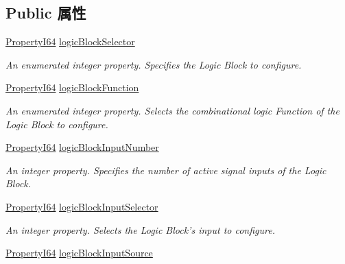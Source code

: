 \subsection*{Public 属性}
\begin{DoxyCompactItemize}
\item 
\hyperlink{group___common_interface_ga81749b2696755513663492664a18a893}{Property\+I64} \hyperlink{classmv_i_m_p_a_c_t_1_1acquire_1_1_gen_i_cam_1_1_logic_block_control_a9868d7f6639f3e51774871a571e0dfe7}{logic\+Block\+Selector}
\begin{DoxyCompactList}\small\item\em An enumerated integer property. Specifies the Logic Block to configure. \end{DoxyCompactList}\item 
\hyperlink{group___common_interface_ga81749b2696755513663492664a18a893}{Property\+I64} \hyperlink{classmv_i_m_p_a_c_t_1_1acquire_1_1_gen_i_cam_1_1_logic_block_control_a21d207d6726eb9779295e3edf5216f55}{logic\+Block\+Function}
\begin{DoxyCompactList}\small\item\em An enumerated integer property. Selects the combinational logic Function of the Logic Block to configure. \end{DoxyCompactList}\item 
\hyperlink{group___common_interface_ga81749b2696755513663492664a18a893}{Property\+I64} \hyperlink{classmv_i_m_p_a_c_t_1_1acquire_1_1_gen_i_cam_1_1_logic_block_control_aaf6dce626150725cd30dd0174a515abb}{logic\+Block\+Input\+Number}
\begin{DoxyCompactList}\small\item\em An integer property. Specifies the number of active signal inputs of the Logic Block. \end{DoxyCompactList}\item 
\hyperlink{group___common_interface_ga81749b2696755513663492664a18a893}{Property\+I64} \hyperlink{classmv_i_m_p_a_c_t_1_1acquire_1_1_gen_i_cam_1_1_logic_block_control_a0ead89ee91cbaf6afcd068ba5f96caa5}{logic\+Block\+Input\+Selector}
\begin{DoxyCompactList}\small\item\em An integer property. Selects the Logic Block's input to configure. \end{DoxyCompactList}\item 
\hyperlink{group___common_interface_ga81749b2696755513663492664a18a893}{Property\+I64} \hyperlink{classmv_i_m_p_a_c_t_1_1acquire_1_1_gen_i_cam_1_1_logic_block_control_a3217fe86aec15819297079c277a0c7b0}{logic\+Block\+Input\+Source}

\end{DoxyCompactItemize}
